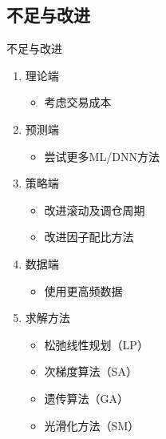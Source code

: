 \documentclass[CJK,aspectratio=43]{beamer}  %
\begin{document}
\subsection{不足与改进}
\begin{frame}{不足与改进}
	\begin{enumerate}
		\item 理论端
		\begin{itemize}
			\item 考虑交易成本
		\end{itemize}
		\item  预测端
		\begin{itemize}
			\item 尝试更多ML/DNN方法
		\end{itemize}
		\item  策略端
		\begin{itemize}
			\item 改进滚动及调仓周期
			\item 改进因子配比方法
		\end{itemize}
		\item  数据端
		\begin{itemize}
			\item 使用更高频数据
		\end{itemize}
		\item  求解方法
		\begin{itemize}
			\item 松弛线性规划（LP）
			\item 次梯度算法（SA）
			\item 遗传算法（GA）
			\item 光滑化方法（SM）
		\end{itemize}
	\end{enumerate}
\end{frame}
\end{document}

